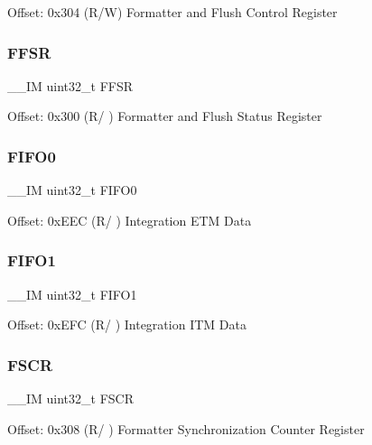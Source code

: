 Offset\+: 0x304 (R/W) Formatter and Flush Control Register \mbox{\label{struct_t_p_i___type_a2a049b49e9da6772d38166397ce8fc70}} 
\subsubsection{\texorpdfstring{FFSR}{FFSR}}
{\footnotesize\ttfamily \+\_\+\+\_\+\+IM uint32\+\_\+t F\+F\+SR}

Offset\+: 0x300 (R/ ) Formatter and Flush Status Register \mbox{\label{struct_t_p_i___type_ace73d78eff029b698e11cd5cf3efaf94}} 
\subsubsection{\texorpdfstring{FIFO0}{FIFO0}}
{\footnotesize\ttfamily \+\_\+\+\_\+\+IM uint32\+\_\+t F\+I\+F\+O0}

Offset\+: 0x\+E\+EC (R/ ) Integration E\+TM Data \mbox{\label{struct_t_p_i___type_abad7737b3d46cc6d4813d37171d29745}} 
\subsubsection{\texorpdfstring{FIFO1}{FIFO1}}
{\footnotesize\ttfamily \+\_\+\+\_\+\+IM uint32\+\_\+t F\+I\+F\+O1}

Offset\+: 0x\+E\+FC (R/ ) Integration I\+TM Data \mbox{\label{struct_t_p_i___type_a36370b2b0879b7b497f6dd854ba02873}} 
\subsubsection{\texorpdfstring{FSCR}{FSCR}}
{\footnotesize\ttfamily \+\_\+\+\_\+\+IM uint32\+\_\+t F\+S\+CR}

Offset\+: 0x308 (R/ ) Formatter Synchronization Counter Register \mbox{\label{struct_t_p_i___type_a9954c088735caa505adc113f6c64d812}} 
